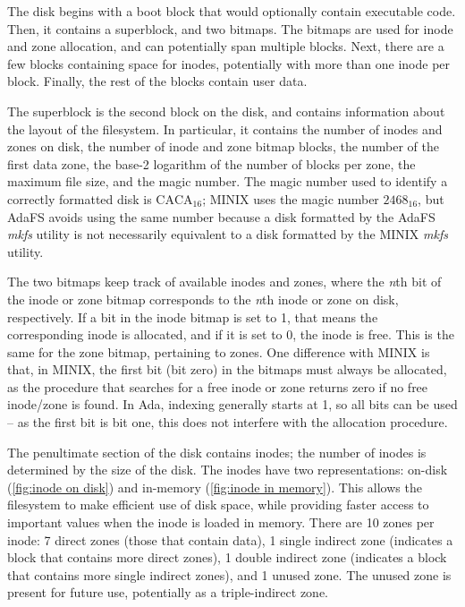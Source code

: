 The disk begins with a boot block that would optionally contain executable code.
Then, it contains a superblock, and two bitmaps.
The bitmaps are used for inode and zone allocation, and can potentially span multiple blocks.
Next, there are a few blocks containing space for inodes, potentially with more than one inode per block.
Finally, the rest of the blocks contain user data.

The superblock is the second block on the disk, and contains information about the layout of the filesystem.
In particular, it contains the number of inodes and zones on disk, the number of inode and zone bitmap blocks, the number of the first data zone, the base-2 logarithm of the number of blocks per zone, the maximum file size, and the magic number.
The magic number used to identify a correctly formatted disk is $\text{CACA}_{16}$; MINIX uses the magic number $2468_{16}$, but AdaFS avoids using the same number because a disk formatted by the AdaFS \textit{mkfs} utility is not necessarily equivalent to a disk formatted by the MINIX \textit{mkfs} utility.

The two bitmaps keep track of available inodes and zones, where the \textit{n}th bit of the inode or zone bitmap corresponds to the \textit{n}th inode or zone on disk, respectively.
If a bit in the inode bitmap is set to 1, that means the corresponding inode is allocated, and if it is set to 0, the inode is free.
This is the same for the zone bitmap, pertaining to zones.
One difference with MINIX is that, in MINIX, the first bit (bit zero) in the bitmaps must always be allocated, as the procedure that searches for a free inode or zone returns zero if no free inode/zone is found.
In Ada, indexing generally starts at 1, so all bits can be used -- as the first bit is bit one, this does not interfere with the allocation procedure.

The penultimate section of the disk contains inodes; the number of inodes is determined by the size of the disk.
The inodes have two representations: on-disk (\autoref{fig:inode on disk}) and in-memory (\autoref{fig:inode in memory}).
This allows the filesystem to make efficient use of disk space, while providing faster access to important values when the inode is loaded in memory.
There are 10 zones per inode: 7 direct zones (those that contain data), 1 single indirect zone (indicates a block that contains more direct zones), 1 double indirect zone (indicates a block that contains more single indirect zones), and 1 unused zone.
The unused zone is present for future use, potentially as a triple-indirect zone.

